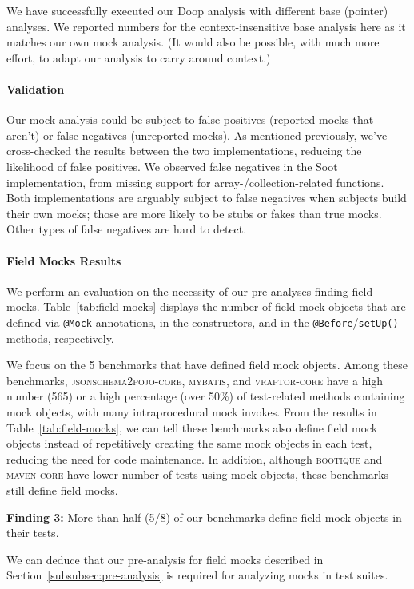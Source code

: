We have successfully executed our Doop analysis with different base (pointer) analyses. We reported numbers for the context-insensitive base analysis here as it matches our own mock analysis. (It would also be possible, with much more effort, to adapt our analysis to carry around context.)

\paragraph{Validation} Our mock analysis could be subject to false positives (reported mocks that aren't) or false negatives (unreported mocks). As mentioned previously, we've cross-checked the results between the two implementations, reducing the likelihood of false positives. We observed false negatives in the Soot implementation, from missing support for array-/collection-related functions. Both implementations are arguably subject to false negatives when subjects build their own mocks; those are more likely to be stubs or fakes than true mocks. Other types of false negatives are hard to detect.

\paragraph{Field Mocks Results} We perform an evaluation on the necessity of our pre-analyses finding field mocks. 
Table~\ref{tab:field-mocks} displays the number of field mock objects that are defined via \texttt{@Mock} annotations, in the constructors, and in the \texttt{@Before}/\texttt{setUp()} methods, respectively. 

We focus on the 5 benchmarks that have defined field mock objects. 
Among these benchmarks, \textsc{jsonschema2pojo-core}, \textsc{mybatis}, and \textsc{vraptor-core} have a high number (565) or a high percentage (over 50\%) of test-related methods containing mock objects, with many intraprocedural mock invokes. From the results in Table~\ref{tab:field-mocks}, we can tell these benchmarks also define field mock objects instead of repetitively creating the same mock objects in each test, reducing the need for code maintenance. In addition, although \textsc{bootique} and \textsc{maven-core} have lower number of tests using mock objects, these benchmarks still define field mocks. 

\begin{mdframed}[
  leftmargin=\parindent,
  rightmargin=\parindent,
  skipabove=\topsep,
  skipbelow=\topsep
  ]
{\bf Finding 3:} More than half (5/8) of our benchmarks define field mock objects in their tests.
\end{mdframed}
We can deduce that our pre-analysis for field mocks described in Section~\ref{subsubsec:pre-analysis} is required for analyzing mocks in  test suites.

